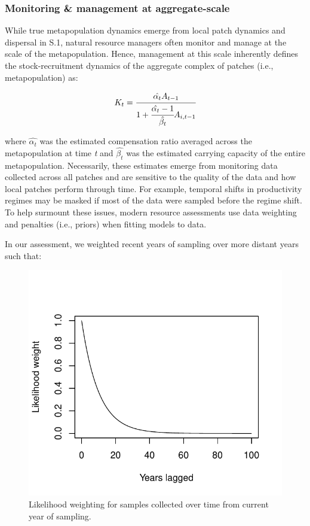 \documentclass[
]{article}
\begin{document}
\hypertarget{monitoring-management-at-aggregate-scale}{%
\subsubsection{Monitoring \& management at
aggregate-scale}\label{monitoring-management-at-aggregate-scale}}

While true metapopulation dynamics emerge from local patch dynamics and
dispersal in S.1, natural resource managers often monitor and manage at
the scale of the metapopulation. Hence, management at this scale
inherently defines the stock-recruitment dynamics of the aggregate
complex of patches (i.e., metapopulation) as:

\begin{align}
{K}_{t}=\cfrac{\hat{\alpha_t}{A}_{t-1}}{1+\cfrac{\hat{\alpha_t}-1}{\hat{\beta_t}}{A}_{i,t-1}}
\end{align}

where \(\hat{\alpha_t}\) was the estimated compensation ratio averaged
across the metapopulation at time \emph{t} and \(\hat{\beta_t}\) was the
estimated carrying capacity of the entire metapopulation. Necessarily,
these estimates emerge from monitoring data collected across all patches
and are sensitive to the quality of the data and how local patches
perform through time. For example, temporal shifts in productivity
regimes may be masked if most of the data were sampled before the regime
shift. To help surmount these issues, modern resource assessments use
data weighting and penalties (i.e., priors) when fitting models to data.

In our assessment, we weighted recent years of sampling over more
distant years such that:

\begin{figure}[H]

{\centering \includegraphics{Managing_for_ecological_surprises_in_metapopulations_files/figure-latex/unnamed-chunk-1-1} 

}

\caption{Likelihood weighting for samples collected over time from current year of sampling.}\label{fig:unnamed-chunk-1}
\end{figure}
\end{document}
